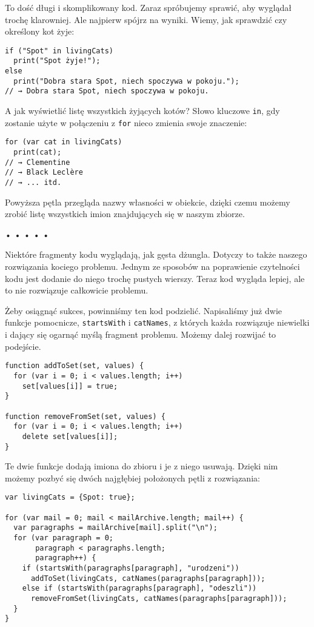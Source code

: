 To dość długi i skomplikowany kod. Zaraz spróbujemy sprawić, aby wyglądał trochę klarowniej. Ale najpierw spójrz na wyniki. Wiemy, jak sprawdzić czy określony kot żyje:

    
\begin{verbatim} 
if ("Spot" in livingCats)
  print("Spot żyje!");
else
  print("Dobra stara Spot, niech spoczywa w pokoju.");
// → Dobra stara Spot, niech spoczywa w pokoju.
\end{verbatim}
    
A jak wyświetlić listę wszystkich żyjących kotów? Słowo kluczowe \texttt{in}, gdy zostanie użyte w połączeniu z \texttt{for} nieco zmienia swoje znaczenie:

    
\begin{verbatim} 
for (var cat in livingCats)
  print(cat);
// → Clementine
// → Black Leclère
// → ... itd.
\end{verbatim}
    
Powyższa pętla przegląda nazwy własności w obiekcie, dzięki czemu możemy zrobić listę wszystkich imion znajdujących się w naszym zbiorze.

  
  
\begin{center}
• • • • •
\end{center}
  
    
Niektóre fragmenty kodu wyglądają, jak gęsta dżungla. Dotyczy to także naszego rozwiązania kociego problemu. Jednym ze sposobów na poprawienie czytelności kodu jest dodanie do niego trochę pustych wierszy. Teraz kod wygląda lepiej, ale to nie rozwiązuje całkowicie problemu.

    
Żeby osiągnąć sukces, powinniśmy ten kod podzielić. Napisaliśmy już dwie funkcje pomocnicze, \texttt{startsWith} i \texttt{catNames}, z których każda rozwiązuje niewielki i dający się ogarnąć myślą fragment problemu. Możemy dalej rozwijać to podejście.

    
\begin{verbatim} 
function addToSet(set, values) {
  for (var i = 0; i < values.length; i++)
    set[values[i]] = true;
}

function removeFromSet(set, values) {
  for (var i = 0; i < values.length; i++)
    delete set[values[i]];
}
 \end{verbatim}
    
Te dwie funkcje dodają imiona do zbioru i je z niego usuwają. Dzięki nim możemy pozbyć się dwóch najgłębiej położonych pętli z rozwiązania:

    
\begin{verbatim} 
var livingCats = {Spot: true};

for (var mail = 0; mail < mailArchive.length; mail++) {
  var paragraphs = mailArchive[mail].split("\n");
  for (var paragraph = 0;
       paragraph < paragraphs.length;
       paragraph++) {
    if (startsWith(paragraphs[paragraph], "urodzeni"))
      addToSet(livingCats, catNames(paragraphs[paragraph]));
    else if (startsWith(paragraphs[paragraph], "odeszli"))
      removeFromSet(livingCats, catNames(paragraphs[paragraph]));
  }
}
 \end{verbatim}
    
